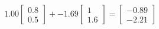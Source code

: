 \documentclass[preview]{standalone}
\begin{document}
\begin{align*}
1.00 \begin{bmatrix} 0.8 \\ 0.5 \end{bmatrix} + -1.69 \begin{bmatrix} 1 \\ 1.6 \end{bmatrix} = \begin{bmatrix} -0.89 \\ -2.21 \end{bmatrix}
\end{align*}
\end{document}
